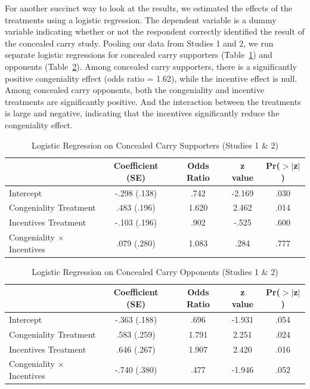 \documentclass[12pt, letterpaper]{article}
\begin{document}
For another succinct way to look at the results, we estimated the effects of the treatments using a logistic regression. The dependent variable is a dummy variable indicating whether or not the respondent correctly identified the result of the concealed carry study. Pooling our data from Studies 1 and 2, we run separate logistic regressions for concealed carry supporters (Table~\ref{tab:logit1}) and opponents (Table~\ref{tab:logit2}). Among concealed carry supporters, there is a significantly positive congeniality effect (odds ratio = 1.62), while the incentive effect is null. Among concealed carry opponents, both the congeniality and incentive treatments are significantly positive. And the interaction between the treatments is large and negative, indicating that the incentives significantly reduce the congeniality effect.

\bigskip
\begin{table}[ht]
\centering
\caption{Logistic Regression on Concealed Carry Supporters (Studies 1 \& 2)} \label{tab:logit1}
\begin{tabular}{l c c c c}
  \hline
 						& Coefficient (SE) & Odds Ratio 	& z value 	& Pr($>$$|$z$|$) \\ \hline
  Intercept 					& -.298 (.138) 		& .742 	& -2.169	& .030 \\ 
  Congeniality Treatment		& .483 (.196) 		& 1.620 	& 2.462 	& .014 \\ 
  Incentives Treatment		& -.103 (.196) 		& .902 	& -.525 	& .600 \\ 
  Congeniality $\times$ Incentives & .079 (.280) 		& 1.083 	& .284 	& .777 \\  \hline
\end{tabular}
\end{table}
\normalsize
\doublespacing

\begin{table}[ht]
\centering
\caption{Logistic Regression on Concealed Carry Opponents (Studies 1 \& 2)} \label{tab:logit2}
\begin{tabular}{l c c c c}
  \hline
 						& Coefficient (SE) & Odds Ratio 	& z value 	& Pr($>$$|$z$|$) \\ \hline
  Intercept 					& -.363 (.188) 		& .696 	& -1.931	& .054 \\ 
  Congeniality Treatment		& .583 (.259) 		& 1.791 	& 2.251 	& .024 \\ 
  Incentives Treatment		& .646 (.267) 		& 1.907 	& 2.420 	& .016 \\ 
  Congeniality $\times$ Incentives & -.740 (.380) 		& .477 	& -1.946 	& .052 \\  \hline
\end{tabular}
\end{table}
\normalsize
\doublespacing
\end{document}
